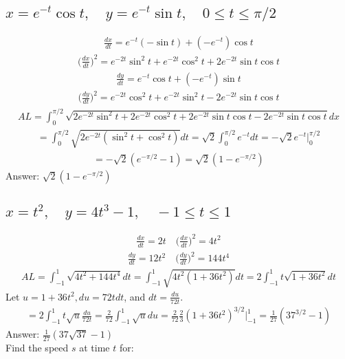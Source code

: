 \documentclass{article}
\begin{document}
\subsection{$x = e^{-t} \cos{t}, \quad y = e^{-t} \sin{t}, \quad 0 \leq t \leq \pi /2$}
\begin{align*}
	\frac{dx}{dt} = e^{-t}(-\sin{t}) + (-e^{-t}) \cos{t}
\end{align*}
\begin{align*}
	\bigg( \frac{dx}{dt} \bigg)^2 = e^{-2t}\sin^2{t} + e^{-2t} \cos^2{t} + 2e^{-2t}\sin{t}\cos{t}
\end{align*}
\begin{align*}
	\frac{dy}{dt} = e^{-t}\cos{t} + (-e^{-t})\sin{t}
\end{align*}
\begin{align*}
	\bigg( \frac{dy}{dt} \bigg)^2 = e^{-2t} \cos^2{t} + e^{-2t} \sin^2{t} - 2e^{-2t} \sin{t} \cos{t}
\end{align*}
\begin{align*}
	AL = \int_0^{\pi/2} {\sqrt{2e^{-2t}\sin^2{t} + 2e^{-2t} \cos^2{t} + 2e^{-2t}\sin{t}\cos{t} - 2e^{-2t} \sin{t} \cos{t}}dx}
\end{align*}
\begin{align*}
	= \int_0^{\pi/2} {\sqrt{2e^{-2t} (\sin^2{t} + \cos^2{t})}dt} = \sqrt{2} \int_0^{\pi/2} {e^{-t}dt} = -\sqrt{2} e^{-t} \bigg|_0^{\pi/2}
\end{align*}
\begin{align*}
	= -\sqrt{2} (e^{-\pi/2} - 1) = \sqrt{2} (1 - e^{-\pi/2})
\end{align*}
Answer: $\sqrt{2}(1 - e^{-\pi/2})$

\subsection{$x = t^2, \quad y = 4t^3 - 1, \quad -1 \leq t \leq 1$}
\begin{align*}
	\frac{dx}{dt} = 2t \quad \bigg( \frac{dx}{dt} \bigg)^2 = 4t^2
\end{align*}
\begin{align*}
	\frac{dy}{dt} = 12t^2 \quad \bigg( \frac{dy}{dt} \bigg)^2 = 144t^4
\end{align*}
\begin{align*}
	AL = \int_{-1}^1 {\sqrt{4t^2 + 144t^4}dt} = \int_{-1}^1 {\sqrt{4t^2(1 + 36t^2)}dt} = 2\int_{-1}^1 {t\sqrt{1 + 36t^2}dt}
\end{align*}
Let $u = 1 + 36t^2, du = 72tdt$, and $dt = \frac{du}{72t}$. 
\begin{align*}
	= 2\int_{-1}^1 {t \sqrt{u} \frac{du}{72t}} = \frac{2}{72} \int_{-1}^1 {\sqrt{u}du} = \frac{2}{72} \frac{2}{3} (1 + 36t^2)^{3/2} \bigg|_{-1}^1 = \frac{1}{27}(37^{3/2} - 1)
\end{align*}
Answer: $\frac{1}{27}(37\sqrt{37} - 1)$
\\[10pt]
Find the speed $s$ at time $t$ for:
\end{document}

